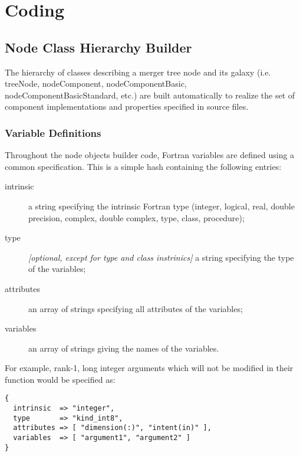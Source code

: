 \chapter{Coding \glc}

\section{Node Class Hierarchy Builder}

The hierarchy of classes describing a merger tree node and its galaxy (i.e. {\normalfont \ttfamily treeNode}, {\normalfont \ttfamily nodeComponent}, {\normalfont \ttfamily nodeComponentBasic}, {\normalfont \ttfamily nodeComponentBasicStandard}, etc.) are built automatically to realize the set of component implementations and properties specified in source files.

\subsection{Variable Definitions}\label{sec:nodeBuilderVariableDefinitions}

Throughout the node objects builder code, Fortran variables are defined using a common specification. This is a simple hash containing the following entries:
\begin{description}
  \item[intrinsic] a string specifying the intrinsic Fortran type ({\normalfont \ttfamily integer}, {\normalfont \ttfamily logical}, {\normalfont \ttfamily real}, {\normalfont \ttfamily double precision}, {\normalfont \ttfamily complex}, {\normalfont \ttfamily double complex}, {\normalfont \ttfamily type}, {\normalfont \ttfamily class}, {\normalfont \ttfamily procedure});
  \item[type] \emph{[optional, except for {\normalfont \ttfamily type} and {\normalfont \ttfamily class} instrinics]} a string specifying the type of the variables;
  \item[attributes] an array of strings specifying all attributes of the variables;
  \item[variables] an array of strings giving the names of the variables.
\end{description}
For example, rank-1, long integer arguments which will not be modified in their function would be specified as:
\begin{verbatim}
{
  intrinsic  => "integer", 
  type       => "kind_int8",
  attributes => [ "dimension(:)", "intent(in)" ],
  variables  => [ "argument1", "argument2" ]
}
\end{verbatim}

